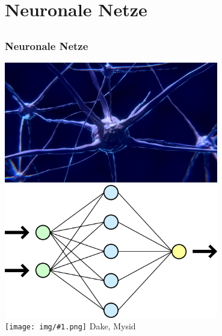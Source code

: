 \documentclass[12pt]{beamer}
\newcommand{\cc}[1]{\texttt{[image: img/\#1.png]}\hspace{1mm}}
\begin{document}
\section{Neuronale Netze}
\subsection{}

\begin{frame}
  \frametitle{Neuronale Netze}
  \begin{center}
     {
      \includegraphics[width=0.7\textwidth]{img/neuron.jpg} \\
    }
     {
      \includegraphics[width=0.7\textwidth]{img/network.png} \\
      \vspace{0.5cm}
      \tiny \cc{by-sa} Dake, Mysid
    }
  \end{center}
\end{frame}
\end{document}
